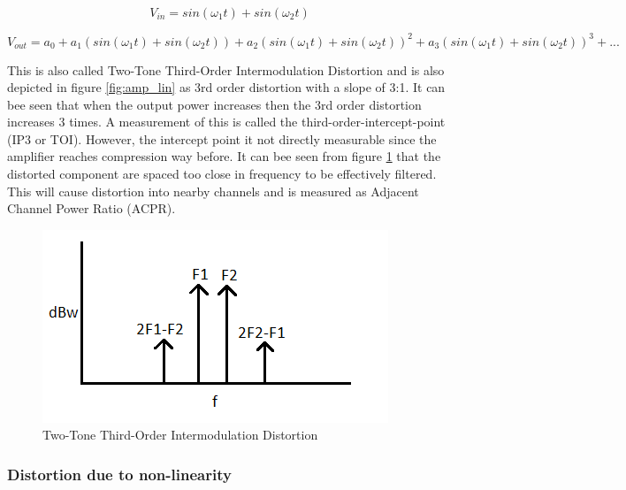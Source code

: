 \begin{equation}\label{eq:dest1}
V_{in} = sin(\omega_1 t) + sin(\omega_2 t)
\end{equation} 

\begin{equation} \label{eq:dest2}
V_{out} = a_0 + a_1 (sin(\omega_1 t) + sin(\omega_2 t)) + a_2 (sin(\omega_1 t) + sin(\omega_2 t))^2 + a_3 (sin(\omega_1 t) + sin(\omega_2 t))^3 + ... 
\end{equation}


This is also called Two-Tone Third-Order Intermodulation Distortion and is also depicted in figure \ref{fig:amp_lin} as 3rd order distortion with a slope of 3:1. It can bee seen that when the output power increases then the 3rd order distortion increases 3 times. A measurement of this is called the third-order-intercept-point (IP3 or TOI). However, the intercept point it not directly measurable since the amplifier reaches compression way before. It can bee seen from figure \ref{fig:amp_psd} that the distorted component are spaced too close in frequency to be effectively filtered. This will cause distortion into nearby channels and is measured as Adjacent Channel Power Ratio (ACPR).

\begin{figure}[H]
\centering 
\includegraphics[scale = 0.7]{figures/ch1/amp_psd.png}
\caption{Two-Tone Third-Order Intermodulation Distortion}
\label{fig:amp_psd}
\end{figure}

\subsubsection{Distortion due to non-linearity}

